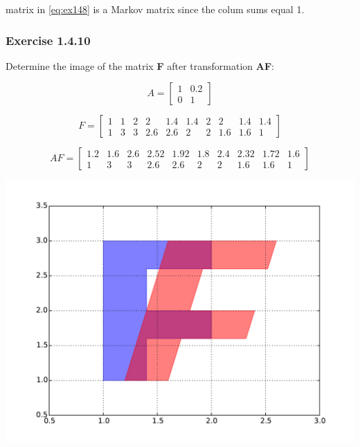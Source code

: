 matrix in \ref{eq:ex148} is a Markov matrix since the colum sums equal 1.

\subsubsection{Exercise 1.4.10}

Determine the image of the matrix \textbf{F} after transformation \textbf{AF}:

\begin{equation}
A = \left[\begin{matrix}1 & 0.2\\0 & 1\end{matrix}\right]
\end{equation}

\begin{equation}
F = \left[\begin{matrix}1 & 1 & 2 & 2 & 1.4 & 1.4 & 2 & 2 & 1.4 & 1.4\\1 & 3 & 3 & 2.6 & 2.6 & 2 & 2 & 1.6 & 1.6 & 1\end{matrix}\right]
\end{equation}

\begin{equation}\label{eq:}
AF = \left[\begin{matrix}1.2 & 1.6 & 2.6 & 2.52 & 1.92 & 1.8 & 2.4 & 2.32 & 1.72 & 1.6\\1 & 3 & 3 & 2.6 & 2.6 & 2 & 2 & 1.6 & 1.6 & 1\end{matrix}\right]
\end{equation}

\includegraphics[width=\linewidth]{figs/1_4_10.pdf}

